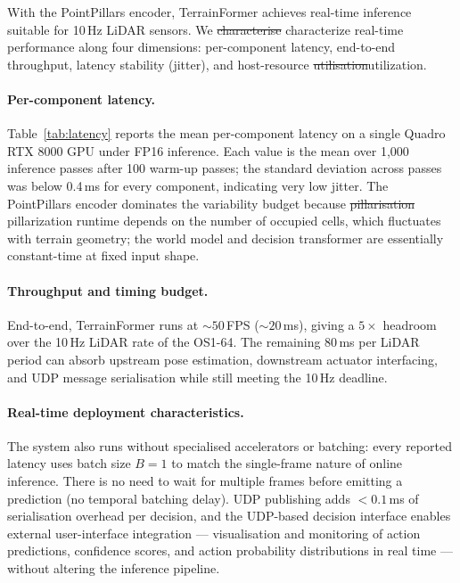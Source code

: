 \documentclass[sensors,article,submit,pdftex,moreauthors]{Definitions/mdpi}
\makeatletter
\providecommand{\DIFadd}[1]{{\protect\color{red}#1}} %
\providecommand{\DIFdel}[1]{{\protect\color{red}\sout{#1}}} %
\providecommand{\DIFaddbegin}{} %
\providecommand{\DIFaddend}{} %
\providecommand{\DIFdelbegin}{} %
\providecommand{\DIFdelend}{} %
\providecommand{\DIFscaledelfig}{0.5}
\newlength{\DIFdelgraphicswidth} %
\newlength{\DIFdelgraphicsheight} %
\providecommand{\DIFaddincludegraphics}[2][]{{\color{blue}\fbox{\DIFOincludegraphics[#1]{#2}}}} %
\providecommand{\DIFdelincludegraphics}[2][]{%
\sbox{\DIFdelgraphicsbox}{\DIFOincludegraphics[#1]{#2}}%
\settoboxwidth{\DIFdelgraphicswidth}{\DIFdelgraphicsbox} %
\settoboxtotalheight{\DIFdelgraphicsheight}{\DIFdelgraphicsbox} %
\scalebox{\DIFscaledelfig}{%
\parbox[b]{\DIFdelgraphicswidth}{\usebox{\DIFdelgraphicsbox}\\[-\baselineskip] \rule{\DIFdelgraphicswidth}{0em}}\llap{\resizebox{\DIFdelgraphicswidth}{\DIFdelgraphicsheight}{%
\setlength{\unitlength}{\DIFdelgraphicswidth}%
\begin{picture}(1,1)%
\thicklines\linethickness{2pt} %
{\color[rgb]{1,0,0}\put(0,0){\framebox(1,1){}}}%
{\color[rgb]{1,0,0}\put(0,0){\line( 1,1){1}}}%
{\color[rgb]{1,0,0}\put(0,1){\line(1,-1){1}}}%
\end{picture}%
}\hspace*{3pt}}} %
} %
\DeclareRobustCommand{\DIFaddbegin}{\DIFOaddbegin \let\includegraphics\DIFaddincludegraphics} %
\DeclareRobustCommand{\DIFaddend}{\DIFOaddend \let\includegraphics\DIFOincludegraphics} %
\DeclareRobustCommand{\DIFdelbegin}{\DIFOdelbegin \let\includegraphics\DIFdelincludegraphics} %
\DeclareRobustCommand{\DIFdelend}{\DIFOaddend \let\includegraphics\DIFOincludegraphics} %
\let\sout@orig\sout %
\renewcommand{\sout}[1]{\ifmmode\text{\sout@orig{\ensuremath{#1}}}\else\sout@orig{#1}\fi} %
\makeatother
\begin{document}
With the PointPillars encoder, TerrainFormer achieves real-time inference suitable for 10\,Hz LiDAR sensors. We \DIFdelbegin \DIFdel{characterise }\DIFdelend \DIFaddbegin \DIFadd{characterize }\DIFaddend real-time performance along four dimensions: per-component latency, end-to-end throughput, latency stability (jitter), and host-resource \DIFdelbegin \DIFdel{utilisation}\DIFdelend \DIFaddbegin \DIFadd{utilization}\DIFaddend .

\paragraph{Per-component latency.}
Table~\ref{tab:latency} reports the mean per-component latency on a single Quadro RTX 8000 GPU under FP16 inference. Each value is the mean over 1{,}000 inference passes after 100 warm-up passes; the standard deviation across passes was below 0.4\,ms for every component, indicating very low jitter. The PointPillars encoder dominates the variability budget because \DIFdelbegin \DIFdel{pillarisation }\DIFdelend \DIFaddbegin \DIFadd{pillarization }\DIFaddend runtime depends on the number of occupied cells, which fluctuates with terrain geometry; the world model and decision transformer are essentially constant-time at fixed input shape.

\paragraph{Throughput and timing budget.}
End-to-end, TerrainFormer runs at ${\sim}50$\,FPS (${\sim}20$\,ms), giving a $5\times$ headroom over the 10\,Hz LiDAR rate of the OS1-64. The remaining 80\,ms per LiDAR period can absorb upstream pose estimation, downstream actuator interfacing, and UDP message serialisation while still meeting the 10\,Hz deadline.

\paragraph{Real-time deployment characteristics.}
The system also runs without specialised accelerators or batching: every reported latency uses batch size $B{=}1$ to match the single-frame nature of online inference. There is no need to wait for multiple frames before emitting a prediction (no temporal batching delay). UDP publishing adds $<0.1$\,ms of serialisation overhead per decision, and the UDP-based decision interface enables external user-interface integration --- visualisation and monitoring of action predictions, confidence scores, and action probability distributions in real time --- without altering the inference pipeline.
\end{document}
